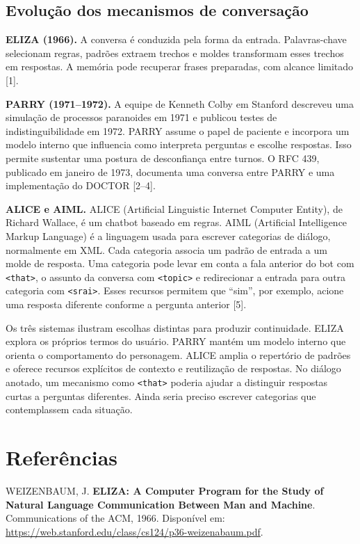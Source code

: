 \documentclass[12pt,a4paper]{article}
\begin{document}
\subsection{Evolução dos mecanismos de conversação}

\textbf{ELIZA (1966).} A conversa é conduzida pela forma da entrada. Palavras-chave selecionam regras, padrões extraem trechos e moldes transformam esses trechos em respostas. A memória pode recuperar frases preparadas, com alcance limitado [1].

\textbf{PARRY (1971--1972).} A equipe de Kenneth Colby em Stanford descreveu uma simulação de processos paranoides em 1971 e publicou testes de indistinguibilidade em 1972. PARRY assume o papel de paciente e incorpora um modelo interno que influencia como interpreta perguntas e escolhe respostas. Isso permite sustentar uma postura de desconfiança entre turnos. O RFC 439, publicado em janeiro de 1973, documenta uma conversa entre PARRY e uma implementação do DOCTOR [2--4].

\textbf{ALICE e AIML.} ALICE (Artificial Linguistic Internet Computer Entity), de Richard Wallace, é um chatbot baseado em regras. AIML (Artificial Intelligence Markup Language) é a linguagem usada para escrever categorias de diálogo, normalmente em XML. Cada categoria associa um padrão de entrada a um molde de resposta. Uma categoria pode levar em conta a fala anterior do bot com \texttt{<that>}, o assunto da conversa com \texttt{<topic>} e redirecionar a entrada para outra categoria com \texttt{<srai>}. Esses recursos permitem que ``sim'', por exemplo, acione uma resposta diferente conforme a pergunta anterior [5].

Os três sistemas ilustram escolhas distintas para produzir continuidade. ELIZA explora os próprios termos do usuário. PARRY mantém um modelo interno que orienta o comportamento do personagem. ALICE amplia o repertório de padrões e oferece recursos explícitos de contexto e reutilização de respostas. No diálogo anotado, um mecanismo como \texttt{<that>} poderia ajudar a distinguir respostas curtas a perguntas diferentes. Ainda seria preciso escrever categorias que contemplassem cada situação.

\section*{Referências}

\noindent [1] WEIZENBAUM, J. \textbf{ELIZA: A Computer Program for the Study of Natural Language Communication Between Man and Machine}. Communications of the ACM, 1966. Disponível em: \url{https://web.stanford.edu/class/cs124/p36-weizenabaum.pdf}.
\end{document}
